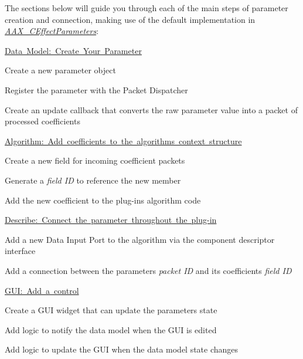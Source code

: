The sections below will guide you through each of the main steps of parameter creation and connection, making use of the default implementation in {\itshape \mbox{\hyperlink{a01481}{A\+A\+X\+\_\+\+C\+Effect\+Parameters}}}\+: 
\begin{DoxyEnumerate}
\item \mbox{\hyperlink{a00794_subsection__data_model_create_your_parameter}{Data Model\+: Create Your Parameter}} 
\begin{DoxyEnumerate}
\item Create a new parameter object  
\item Register the parameter with the Packet Dispatcher  
\item Create an update callback that converts the raw parameter value into a packet of processed coefficients  
\end{DoxyEnumerate}
\item \mbox{\hyperlink{a00794_subsection__algorithm_add_coefficients_to_the_algorithms_context_structure}{Algorithm\+: Add coefficients to the algorithm\textquotesingle{}s context structure}} 
\begin{DoxyEnumerate}
\item Create a new field for incoming coefficient packets  
\item Generate a {\itshape field ID} to reference the new member  
\item Add the new coefficient to the plug-\/in\textquotesingle{}s algorithm code  
\end{DoxyEnumerate}
\item \mbox{\hyperlink{a00794_subsection__describe_connect_the_parameter_throughout_the_plugin}{Describe\+: Connect the parameter throughout the plug-\/in}} 
\begin{DoxyEnumerate}
\item Add a new Data Input Port to the algorithm via the component descriptor interface  
\item Add a connection between the parameter\textquotesingle{}s {\itshape packet ID} and its coefficients\textquotesingle{} {\itshape field ID} 
\end{DoxyEnumerate}
\item \mbox{\hyperlink{a00794_subsection__gui_add_a_control}{G\+U\+I\+: Add a control}} 
\begin{DoxyEnumerate}
\item Create a G\+UI widget that can update the parameter\textquotesingle{}s state  
\item Add logic to notify the data model when the G\+UI is edited  
\item Add logic to update the G\+UI when the data model state changes  
\end{DoxyEnumerate}
\end{DoxyEnumerate}


